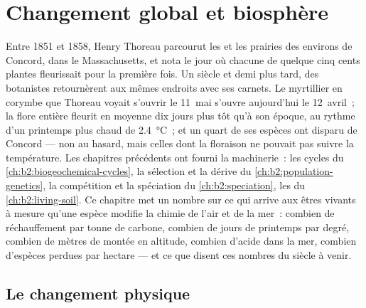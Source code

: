 \chapter{Changement global et biosphère}\label{ch:b2:global-change}

Entre 1851 et 1858, Henry Thoreau parcourut les  et les prairies des
environs de Concord, dans le Massachusetts, et nota le jour où chacune de
quelque cinq cents plantes fleurissait pour la première fois. Un siècle
et demi plus tard, des botanistes retournèrent aux mêmes endroits avec
ses carnets. Le myrtillier en corymbe que Thoreau voyait s'ouvrir le
11~mai s'ouvre aujourd'hui le 12~avril~; la flore entière fleurit en
moyenne dix jours plus tôt qu'à son époque, au rythme d'un printemps plus
chaud de \qty{2.4}{\celsius}~; et un quart de ses espèces ont disparu de
Concord --- non au hasard, mais celles dont la floraison ne pouvait pas
suivre la température. Les chapitres précédents ont fourni la
machinerie~: les cycles du \cref{ch:b2:biogeochemical-cycles}, la
sélection et la dérive du \cref{ch:b2:population-genetics}, la
compétition et la spéciation du \cref{ch:b2:speciation}, les  du
\cref{ch:b2:living-soil}. Ce chapitre met un nombre sur ce qui arrive aux
êtres vivants à mesure qu'une espèce modifie la chimie de l'air et de la
mer~: combien de réchauffement par tonne de carbone, combien de jours de
printemps par degré, combien de mètres de montée en altitude, combien
d'acide dans la mer, combien d'espèces perdues par hectare --- et ce que
disent ces nombres du siècle à venir.

\section{Le changement physique}

